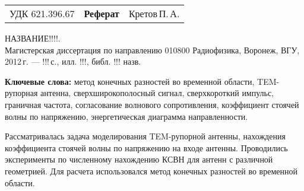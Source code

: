 
\noindent
{
\begin{tabularx}{\textwidth}{lCr}
УДК 621.396.67 & \textbf{Реферат} & Кретов\,П.\,А.
\end{tabularx}}
\vspace{10mm}

НАЗВАНИЕ!!!!.\\
Магистерская диссертация по направлению 010800 Радиофизика, Воронеж, ВГУ, 2012\,г.
--- !!!\,с., илл. !!!, библ. !!! назв.

\vspace{10mm}

\noindent
\textbf{Ключевые слова:}
    метод конечных разностей во временной области,
    TEM-рупорная антенна,
    сверхширокополосный сигнал,
    сверхкороткий импульс,
    граничная частота,
    согласование волнового сопротивления,
    коэффициент стоячей волны по напряжению,
    энергетическая диаграмма направленности.

\vspace{10mm}
Рассматривалась задача моделирования TEM-рупорной антенны, нахождения
коэффициента стоячей волны по напряжению на входе антенны. Проводились
эксперименты по численному нахождению КСВН для антенн с различной геометрией.
Для расчета использовался метод конечных разностей во временной области.
\clearpage

